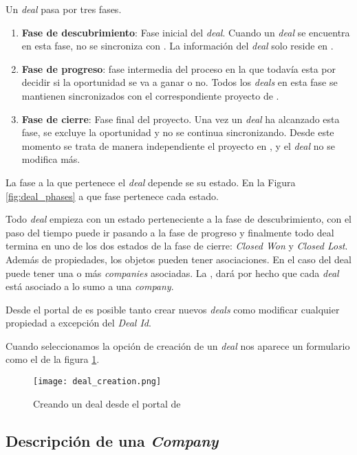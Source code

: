 		
		Un \textit{deal} pasa por tres fases.
		
		\begin{enumerate}
			\item \textbf{Fase de descubrimiento}: Fase inicial del \textit{deal}. Cuando un \textit{deal} se encuentra en esta fase, no se sincroniza con \wday. La información del \textit{deal} solo reside en \hs.
			\item \textbf{Fase de progreso}: fase intermedia del proceso en la que todavía esta por decidir si la oportunidad se va a ganar o no. Todos los \textit{deals} en esta fase se mantienen sincronizados con el correspondiente proyecto de \wday.
			\item \textbf{Fase de cierre}: Fase final del proyecto. Una vez un \textit{deal} ha alcanzado esta fase, se excluye la oportunidad y no se continua sincronizando. Desde este momento se trata de manera independiente el proyecto en \wday{}, y el \textit{deal} no se modifica más. 
		\end{enumerate}
	
		La fase a la que pertenece el \textit{deal} depende se su estado. En la Figura \ref{fig:deal_phases} a que fase pertenece cada estado.
		
		
		Todo \textit{deal} empieza con un estado perteneciente a la fase de descubrimiento, con el paso del tiempo puede ir pasando a la fase de progreso y finalmente todo deal termina en uno de los dos estados de la fase de cierre: \textit{Closed Won} y \textit{Closed Lost}.\\
			
			
		Además de propiedades, los objetos pueden tener asociaciones. En el caso del deal puede tener una o más \textit{companies} asociadas. La \iface{}, dará por hecho que cada \textit{deal} está asociado a lo sumo a una \textit{company}.
			
		Desde el portal de \hs{} es posible tanto crear nuevos \textit{deals} como modificar cualquier propiedad a excepción del \textit{Deal Id}.
		
		Cuando seleccionamos la opción de creación de un \textit{deal} nos aparece un formulario como el de la figura \ref{fig:create_deal}.
		
		\begin{figure}
			\centering
			\texttt{[image: deal\_creation.png]}
			\caption{Creando un deal desde el portal de \hs{}}
			\label{fig:create_deal}
		\end{figure}

\subsection{Descripción de una \textit{Company}}
		
